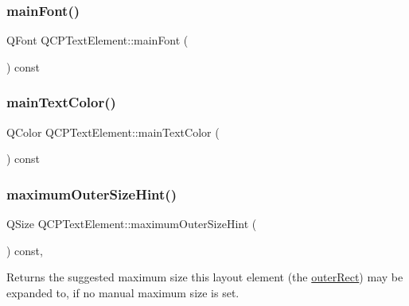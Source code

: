 \mbox{\label{class_q_c_p_text_element_ae236bd398e52939f2de2b70e5e2ba611}} 
\subsubsection{\texorpdfstring{mainFont()}{mainFont()}}
{\footnotesize\ttfamily Q\+Font Q\+C\+P\+Text\+Element\+::main\+Font (\begin{DoxyParamCaption}{ }\end{DoxyParamCaption}) const\hspace{0.3cm}{\ttfamily [protected]}}

\mbox{\label{class_q_c_p_text_element_a63510789e31db34362de97d78e9e7866}} 
\subsubsection{\texorpdfstring{mainTextColor()}{mainTextColor()}}
{\footnotesize\ttfamily Q\+Color Q\+C\+P\+Text\+Element\+::main\+Text\+Color (\begin{DoxyParamCaption}{ }\end{DoxyParamCaption}) const\hspace{0.3cm}{\ttfamily [protected]}}

\mbox{\label{class_q_c_p_text_element_ae82475b50c10a5b3314d996d50ae536b}} 
\subsubsection{\texorpdfstring{maximumOuterSizeHint()}{maximumOuterSizeHint()}}
{\footnotesize\ttfamily Q\+Size Q\+C\+P\+Text\+Element\+::maximum\+Outer\+Size\+Hint (\begin{DoxyParamCaption}{ }\end{DoxyParamCaption}) const\hspace{0.3cm}{\ttfamily [protected]}, {\ttfamily [virtual]}}

Returns the suggested maximum size this layout element (the \mbox{\hyperlink{class_q_c_p_layout_element_a2a32a12a6161c9dffbadeb9cc585510c}{outer\+Rect}}) may be expanded to, if no manual maximum size is set.

